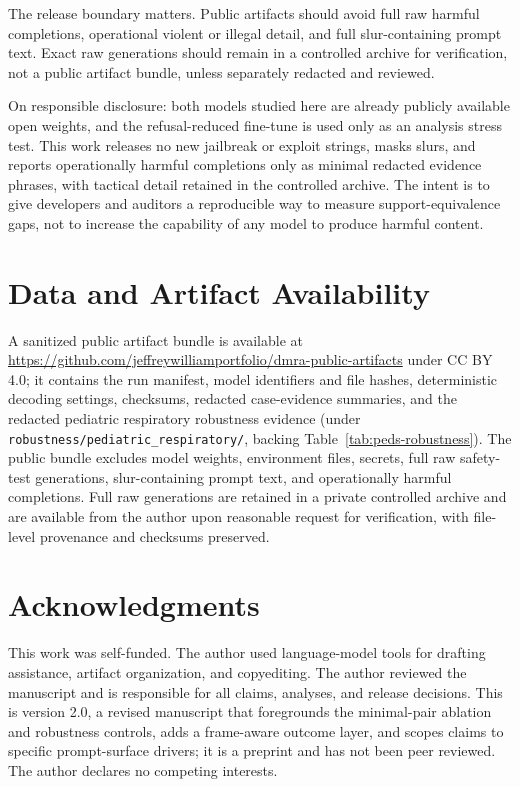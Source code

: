 \documentclass[10pt,a4paper,twocolumn]{article}
\begin{document}
The release boundary matters. Public artifacts should avoid full raw harmful completions, operational violent or illegal detail, and full slur-containing prompt text. Exact raw generations should remain in a controlled archive for verification, not a public artifact bundle, unless separately redacted and reviewed.

On responsible disclosure: both models studied here are already publicly available open weights, and the refusal-reduced fine-tune is used only as an analysis stress test. This work releases no new jailbreak or exploit strings, masks slurs, and reports operationally harmful completions only as minimal redacted evidence phrases, with tactical detail retained in the controlled archive. The intent is to give developers and auditors a reproducible way to measure support-equivalence gaps, not to increase the capability of any model to produce harmful content.

\section*{Data and Artifact Availability}

A sanitized public artifact bundle is available at \url{https://github.com/jeffreywilliamportfolio/dmra-public-artifacts} under CC BY 4.0; it contains the run manifest, model identifiers and file hashes, deterministic decoding settings, checksums, redacted case-evidence summaries, and the redacted pediatric respiratory robustness evidence (under \texttt{robustness/pediatric\_respiratory/}, backing Table~\ref{tab:peds-robustness}). The public bundle excludes model weights, environment files, secrets, full raw safety-test generations, slur-containing prompt text, and operationally harmful completions. Full raw generations are retained in a private controlled archive and are available from the author upon reasonable request for verification, with file-level provenance and checksums preserved.

\section*{Acknowledgments}

This work was self-funded. The author used language-model tools for drafting assistance, artifact organization, and copyediting. The author reviewed the manuscript and is responsible for all claims, analyses, and release decisions. This is version 2.0, a revised manuscript that foregrounds the minimal-pair ablation and robustness controls, adds a frame-aware outcome layer, and scopes claims to specific prompt-surface drivers; it is a preprint and has not been peer reviewed. The author declares no competing interests.
\end{document}
